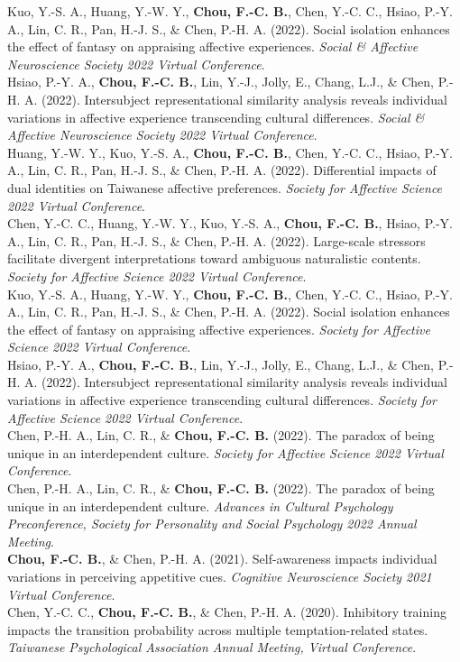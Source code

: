 \documentclass[a4paper,12pt]{article}
\newcommand{\itemspace}{7pt} %
\begin{document}
\noindent Kuo, Y.-S. A., Huang, Y.-W. Y., \textbf{Chou, F.-C. B.}, Chen, Y.-C. C., Hsiao, P.-Y. A., Lin, C. R., Pan, H.-J. S., \& Chen, P.-H. A. (2022). Social isolation enhances the effect of fantasy on appraising affective experiences. \textit{Social \& Affective Neuroscience Society 2022 Virtual Conference}.\\[\itemspace]
\noindent Hsiao, P.-Y. A., \textbf{Chou, F.-C. B.}, Lin, Y.-J., Jolly, E., Chang, L.J., \& Chen, P.-H. A. (2022). Intersubject representational similarity analysis reveals individual variations in affective experience transcending cultural differences. \textit{Social \& Affective Neuroscience Society 2022 Virtual Conference}.\\[\itemspace]
\noindent Huang, Y.-W. Y., Kuo, Y.-S. A., \textbf{Chou, F.-C. B.}, Chen, Y.-C. C., Hsiao, P.-Y. A., Lin, C. R., Pan, H.-J. S., \& Chen, P.-H. A. (2022). Differential impacts of dual identities on Taiwanese affective preferences. \textit{Society for Affective Science 2022 Virtual Conference}.\\[\itemspace]
\noindent Chen, Y.-C. C., Huang, Y.-W. Y., Kuo, Y.-S. A., \textbf{Chou, F.-C. B.}, Hsiao, P.-Y. A., Lin, C. R., Pan, H.-J. S., \& Chen, P.-H. A. (2022). Large-scale stressors facilitate divergent interpretations toward ambiguous naturalistic contents. \textit{Society for Affective Science 2022 Virtual Conference}.\\[\itemspace]
\noindent Kuo, Y.-S. A., Huang, Y.-W. Y., \textbf{Chou, F.-C. B.}, Chen, Y.-C. C., Hsiao, P.-Y. A., Lin, C. R., Pan, H.-J. S., \& Chen, P.-H. A. (2022). Social isolation enhances the effect of fantasy on appraising affective experiences. \textit{Society for Affective Science 2022 Virtual Conference}.\\[\itemspace]
\noindent Hsiao, P.-Y. A., \textbf{Chou, F.-C. B.}, Lin, Y.-J., Jolly, E., Chang, L.J., \& Chen, P.-H. A. (2022). Intersubject representational similarity analysis reveals individual variations in affective experience transcending cultural differences. \textit{Society for Affective Science 2022 Virtual Conference}.\\[\itemspace]
\noindent Chen, P.-H. A., Lin, C. R., \& \textbf{Chou, F.-C. B.} (2022). The paradox of being unique in an interdependent culture. \textit{Society for Affective Science 2022 Virtual Conference}.\\[\itemspace]
\noindent Chen, P.-H. A., Lin, C. R., \& \textbf{Chou, F.-C. B.} (2022). The paradox of being unique in an interdependent culture. \textit{Advances in Cultural Psychology Preconference, Society for Personality and Social Psychology 2022 Annual Meeting}.\\[\itemspace]
\noindent \textbf{Chou, F.-C. B.}, \& Chen, P.-H. A. (2021). Self-awareness impacts individual variations in perceiving appetitive cues. \textit{Cognitive Neuroscience Society 2021 Virtual Conference}.\\[\itemspace]
\noindent Chen, Y.-C. C., \textbf{Chou, F.-C. B.}, \& Chen, P.-H. A. (2020). Inhibitory training impacts the transition probability across multiple temptation-related states. \textit{Taiwanese Psychological Association Annual Meeting, Virtual Conference}.
\end{document}
